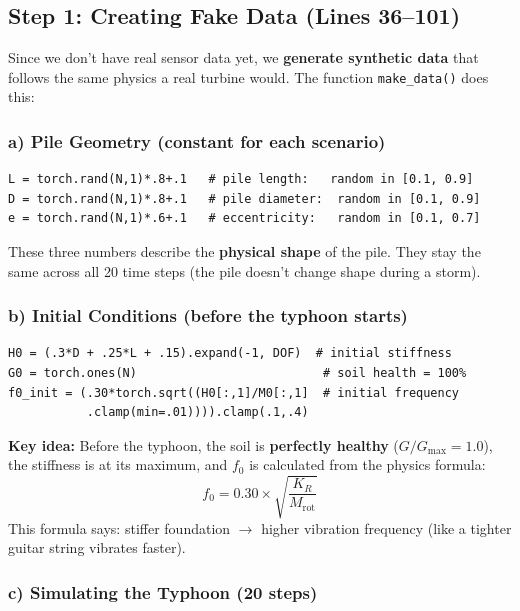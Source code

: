 \documentclass[11pt,a4paper]{article}
\begin{document}
\subsection{Step 1: Creating Fake Data (Lines 36--101)}

Since we don't have real sensor data yet, we \textbf{generate synthetic
data} that follows the same physics a real turbine would.  The function
\texttt{make\_data()} does this:

\subsubsection{a) Pile Geometry (constant for each scenario)}

\begin{lstlisting}
L = torch.rand(N,1)*.8+.1   # pile length:   random in [0.1, 0.9]
D = torch.rand(N,1)*.8+.1   # pile diameter:  random in [0.1, 0.9]
e = torch.rand(N,1)*.6+.1   # eccentricity:   random in [0.1, 0.7]
\end{lstlisting}

These three numbers describe the \textbf{physical shape} of the pile.
They stay the same across all 20 time steps (the pile doesn't change
shape during a storm).

\subsubsection{b) Initial Conditions (before the typhoon starts)}

\begin{lstlisting}
H0 = (.3*D + .25*L + .15).expand(-1, DOF)  # initial stiffness
G0 = torch.ones(N)                          # soil health = 100%
f0_init = (.30*torch.sqrt((H0[:,1]/M0[:,1]  # initial frequency
           .clamp(min=.01)))).clamp(.1,.4)
\end{lstlisting}

\textbf{Key idea:}  Before the typhoon, the soil is \textbf{perfectly
healthy} ($G/G_{\max} = 1.0$), the stiffness is at its maximum, and
$f_0$ is calculated from the physics formula:
\[
  f_0 = 0.30 \times \sqrt{\frac{K_R}{M_{\text{rot}}}}
\]
This formula says: stiffer foundation $\to$ higher vibration frequency
(like a tighter guitar string vibrates faster).

\subsubsection{c) Simulating the Typhoon (20 steps)}
\end{document}
